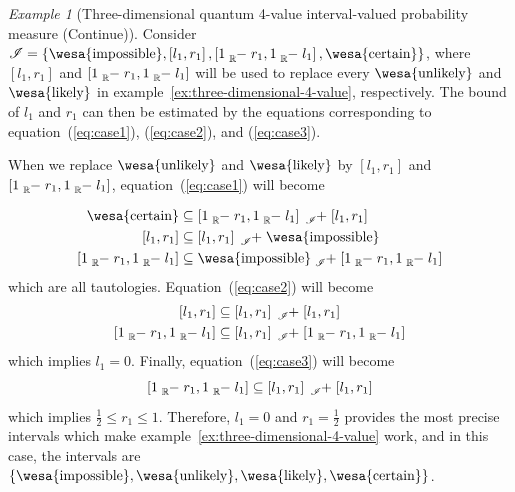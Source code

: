 \documentclass{article}
\theoremstyle{remark}
\newtheorem{example}{Example}
\newcommand{\imposs}{{\mbox{\wesa{impossible}}}}
\newcommand{\likely}{{\mbox{\wesa{likely}}}}
\newcommand{\unlikely}{{\mbox{\wesa{unlikely}}}}
\newcommand{\necess}{{\mbox{\wesa{certain}}}}
\begin{document}
\begin{example}[Three-dimensional quantum 4-value interval-valued
probability measure (Continue)]\label{ex:three-dimensional-4-value-1}
Consider $\mathscr{I}=\left\{ \imposs,\left[l_{1},r_{1}\right],\left[1\tensor*[_{\mathbb{R}}]{-}{}r_{1},1\tensor*[_{\mathbb{R}}]{-}{}l_{1}\right],\necess\right\} $,
where $\left[l_{1},r_{1}\right]$ and $\left[1\tensor*[_{\mathbb{R}}]{-}{}r_{1},1\tensor*[_{\mathbb{R}}]{-}{}l_{1}\right]$
will be used to replace every $\unlikely$ and $\likely$ in example~\ref{ex:three-dimensional-4-value},
respectively. The bound of $l_{1}$ and $r_{1}$ can then be estimated
by the equations corresponding to equation~(\ref{eq:case1}), (\ref{eq:case2}),
and (\ref{eq:case3}).

When we replace $\unlikely$ and $\likely$ by $\left[l_{1},r_{1}\right]$
and $\left[1\tensor*[_{\mathbb{R}}]{-}{}r_{1},1\tensor*[_{\mathbb{R}}]{-}{}l_{1}\right]$,
equation~(\ref{eq:case1}) will become

\begin{equation}
\begin{aligned}\necess & \subseteq\left[1\tensor*[_{\mathbb{R}}]{-}{}r_{1},1\tensor*[_{\mathbb{R}}]{-}{}l_{1}\right]\tensor*[_{\mathscr{I}}]{+}{}\left[l_{1},r_{1}\right]\\
\left[l_{1},r_{1}\right] & \subseteq\left[l_{1},r_{1}\right]\tensor*[_{\mathscr{I}}]{+}{}\imposs\\
\left[1\tensor*[_{\mathbb{R}}]{-}{}r_{1},1\tensor*[_{\mathbb{R}}]{-}{}l_{1}\right] & \subseteq\imposs\tensor*[_{\mathscr{I}}]{+}{}\left[1\tensor*[_{\mathbb{R}}]{-}{}r_{1},1\tensor*[_{\mathbb{R}}]{-}{}l_{1}\right]
\end{aligned}
\label{eq:case1-1}
\end{equation}
which are all tautologies. Equation~(\ref{eq:case2}) will become
\begin{equation}
\begin{aligned}\left[l_{1},r_{1}\right] & \subseteq\left[l_{1},r_{1}\right]\tensor*[_{\mathscr{I}}]{+}{}\left[l_{1},r_{1}\right]\\
\left[1\tensor*[_{\mathbb{R}}]{-}{}r_{1},1\tensor*[_{\mathbb{R}}]{-}{}l_{1}\right] & \subseteq\left[l_{1},r_{1}\right]\tensor*[_{\mathscr{I}}]{+}{}\left[1\tensor*[_{\mathbb{R}}]{-}{}r_{1},1\tensor*[_{\mathbb{R}}]{-}{}l_{1}\right]
\end{aligned}
\label{eq:case2-1}
\end{equation}
which implies $l_{1}=0$. Finally, equation~(\ref{eq:case3}) will
become
\begin{equation}
\left[1\tensor*[_{\mathbb{R}}]{-}{}r_{1},1\tensor*[_{\mathbb{R}}]{-}{}l_{1}\right]\subseteq\left[l_{1},r_{1}\right]\tensor*[_{\mathscr{I}}]{+}{}\left[l_{1},r_{1}\right]\label{eq:case3-1}
\end{equation}
which implies $\frac{1}{2}\le r_{1}\le1$. Therefore, $l_{1}=0$ and
$r_{1}=\frac{1}{2}$ provides the most precise intervals which make
example~\ref{ex:three-dimensional-4-value} work, and in this case,
the intervals are $\left\{ \imposs,\unlikely,\likely,\necess\right\}
$.
\end{example}
\end{document}
